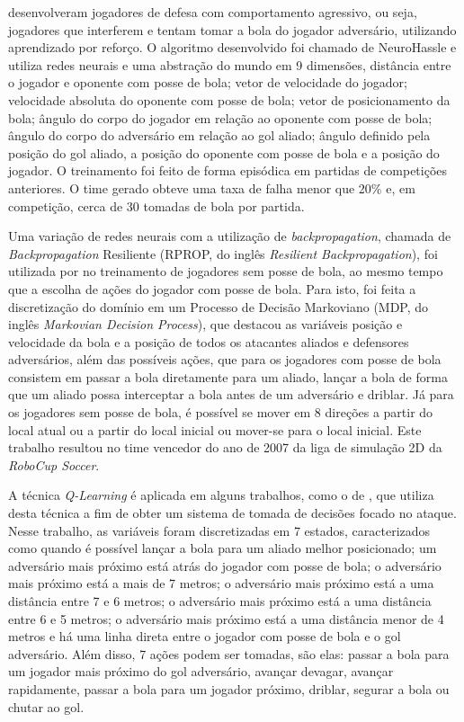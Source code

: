  desenvolveram jogadores de defesa com comportamento agressivo, ou seja,
jogadores que interferem e tentam tomar a bola do jogador adversário, utilizando aprendizado por
reforço. O algoritmo desenvolvido foi chamado de NeuroHassle e utiliza redes neurais e uma abstração
do mundo em 9 dimensões, distância entre o jogador e oponente com posse de bola; vetor de velocidade
do jogador; velocidade absoluta do oponente com posse de bola; vetor de posicionamento da bola;
ângulo do corpo do jogador em relação ao oponente com posse de bola; ângulo do corpo do adversário
em relação ao gol aliado; ângulo definido pela posição do gol aliado, a posição do oponente com
posse de bola e a posição do jogador. O treinamento foi feito de forma episódica em partidas de
competições anteriores. O time gerado obteve uma taxa de falha menor que 20\% e, em competição,
cerca de 30 tomadas de bola por partida.

Uma variação de redes neurais com a utilização de \textit{backpropagation}, chamada de
\textit{Backpropagation} Resiliente (RPROP, do inglês \textit{Resilient Backpropagation}), foi
utilizada por  no treinamento de jogadores sem posse de
bola, ao mesmo tempo que a escolha de ações do jogador com posse de bola. Para isto, foi feita a
discretização do domínio em um Processo de Decisão Markoviano (MDP, do inglês \textit{Markovian
Decision Process}), que destacou as variáveis posição e velocidade da bola e a posição de todos os
atacantes aliados e defensores adversários, além das possíveis ações, que para os jogadores com
posse de bola consistem em passar a bola diretamente para um aliado, lançar a bola de forma que um
aliado possa interceptar a bola antes de um adversário e driblar. Já para os jogadores sem posse de
bola, é possível se mover em 8 direções a partir do local atual ou a partir do local inicial ou
mover-se para o local inicial. Este trabalho resultou no time vencedor do ano de 2007 da liga de
simulação 2D da \textit{RoboCup Soccer}.

A técnica \textit{Q-Learning} é aplicada em alguns trabalhos, como o de
, que utiliza desta técnica a fim de obter um sistema de tomada de
decisões focado no ataque. Nesse trabalho, as variáveis foram discretizadas em 7 estados,
caracterizados como quando é possível lançar a bola para um aliado melhor posicionado; um adversário
mais próximo está atrás do jogador com posse de bola; o adversário mais próximo está a mais de 7
metros; o adversário mais próximo está a uma distância entre 7 e 6 metros; o adversário mais próximo
está a uma distância entre 6 e 5 metros; o adversário mais próximo está a uma distância menor de 4
metros e há uma linha direta entre o jogador com posse de bola e o gol adversário. Além disso, 7
ações podem ser tomadas, são elas: passar a bola para um jogador mais próximo do gol adversário,
avançar devagar, avançar rapidamente, passar a bola para um jogador próximo, driblar, segurar a bola
ou chutar ao gol.

